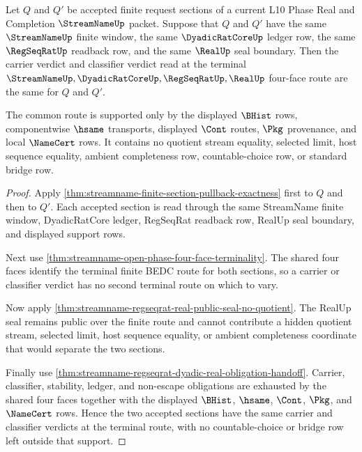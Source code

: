 \begin{theorem}
\label{thm:streamname-finite-section-classifier-determinacy}
Let $Q$ and $Q'$ be accepted finite request sections of a current L10 Phase
Real and Completion $\StreamNameUp$ packet. Suppose that $Q$ and $Q'$ have the
same $\StreamNameUp$ finite window, the same $\DyadicRatCoreUp$ ledger row, the
same $\RegSeqRatUp$ readback row, and the same $\RealUp$ seal boundary. Then
the carrier verdict and classifier verdict read at the terminal
$\StreamNameUp,\DyadicRatCoreUp,\RegSeqRatUp,\RealUp$ four-face route are the
same for $Q$ and $Q'$.

The common route is supported only by the displayed $\BHist$ rows,
componentwise $\hsame$ transports, displayed $\Cont$ routes, $\Pkg$
provenance, and local $\NameCert$ rows. It contains no quotient stream
equality, selected limit, host sequence equality, ambient completeness row,
countable-choice row, or standard bridge row.
\end{theorem}
\begin{proof}
Apply \autoref{thm:streamname-finite-section-pullback-exactness} first to
$Q$ and then to $Q'$. Each accepted section is read through the same
StreamName finite window, DyadicRatCore ledger, RegSeqRat readback row, RealUp
seal boundary, and displayed support rows.

Next use \autoref{thm:streamname-open-phase-four-face-terminality}. The shared
four faces identify the terminal finite BEDC route for both sections, so a
carrier or classifier verdict has no second terminal route on which to vary.

Now apply \autoref{thm:streamname-regseqrat-real-public-seal-no-quotient}. The
RealUp seal remains public over the finite route and cannot contribute a
hidden quotient stream, selected limit, host sequence equality, or ambient
completeness coordinate that would separate the two sections.

Finally use \autoref{thm:streamname-regseqrat-dyadic-real-obligation-handoff}.
Carrier, classifier, stability, ledger, and non-escape obligations are
exhausted by the shared four faces together with the displayed $\BHist$,
$\hsame$, $\Cont$, $\Pkg$, and $\NameCert$ rows. Hence the two accepted
sections have the same carrier and classifier verdicts at the terminal route,
with no countable-choice or bridge row left outside that support.
\end{proof}

